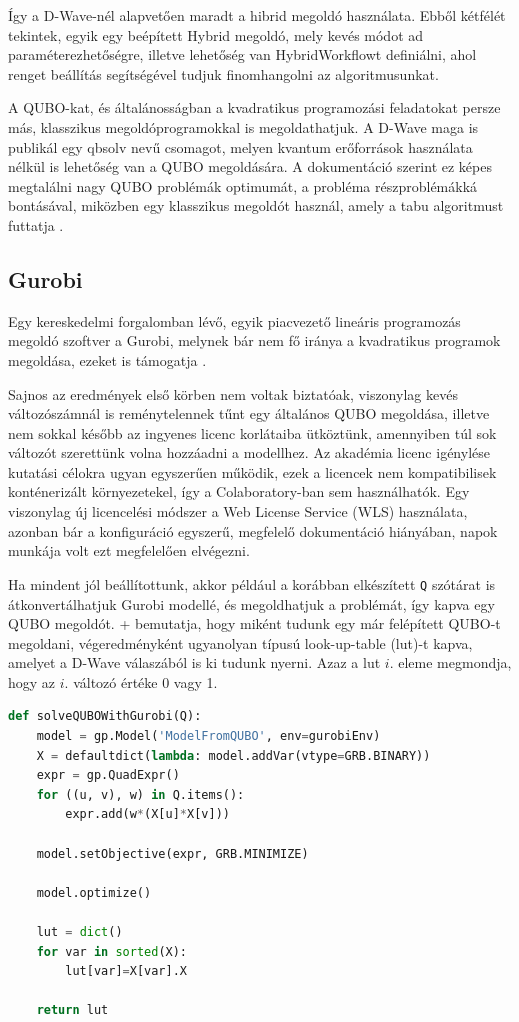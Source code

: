 Így a D-Wave-nél alapvetően maradt a hibrid megoldó használata. Ebből kétfélét tekintek, egyik egy beépített Hybrid megoldó, mely kevés módot ad paraméterezhetőségre, illetve lehetőség van HybridWorkflowt definiálni, ahol renget beállítás segítségével tudjuk finomhangolni az algoritmusunkat.

A QUBO-kat, és általánosságban a kvadratikus programozási feladatokat persze más, klasszikus megoldóprogramokkal is megoldathatjuk. A D-Wave maga is publikál egy qbsolv nevű csomagot, melyen kvantum erőforrások használata nélkül is lehetőség van a QUBO megoldására. A dokumentáció szerint ez képes megtalálni nagy QUBO problémák optimumát, a probléma részproblémákká bontásával, miközben egy klasszikus megoldót használ, amely a tabu algoritmust futtatja \cite{DWaveOceanQbsolv}. 

\subsection{Gurobi}\label{sec:Gurobi}

Egy kereskedelmi forgalomban lévő, egyik piacvezető lineáris programozás megoldó szoftver a Gurobi, melynek bár nem fő iránya a kvadratikus programok megoldása, ezeket is támogatja \cite{gurobi}. 

Sajnos az eredmények első körben nem voltak biztatóak, viszonylag kevés változószámnál is reménytelennek tűnt egy általános QUBO megoldása, illetve nem sokkal később az ingyenes licenc korlátaiba ütköztünk, amennyiben túl sok változót szerettünk volna hozzáadni a modellhez. Az akadémia licenc igénylése kutatási célokra ugyan egyszerűen működik, ezek a licencek nem kompatibilisek konténerizált környezetekel, így a Colaboratory-ban sem használhatók. Egy viszonylag új licencelési módszer a Web License Service (WLS) használata\cite{gurobiWLS}, azonban bár a konfiguráció egyszerű, megfelelő dokumentáció hiányában, napok munkája volt ezt megfelelően elvégezni\cite{gurobiAcademicColab}.

Ha mindent jól beállítottunk, akkor például a korábban elkészített \verb+Q+ szótárat is átkonvertálhatjuk Gurobi modellé, és megoldhatjuk a problémát, így kapva egy QUBO megoldót. \Az+ bemutatja, hogy miként tudunk egy már felépített QUBO-t megoldani, végeredményként ugyanolyan típusú look-up-table (lut)-t kapva, amelyet a D-Wave válaszából is ki tudunk nyerni. Azaz a lut $i.$ eleme megmondja, hogy az $i.$ változó értéke 0 vagy 1.

\begin{lstlisting}[language=python,caption=QUBO megoldása Gurobival,label=code:solveQUBOWithGurobi]	
def solveQUBOWithGurobi(Q):
	model = gp.Model('ModelFromQUBO', env=gurobiEnv)
	X = defaultdict(lambda: model.addVar(vtype=GRB.BINARY))
	expr = gp.QuadExpr()
	for ((u, v), w) in Q.items():
		expr.add(w*(X[u]*X[v]))
	
	model.setObjective(expr, GRB.MINIMIZE)
	
	model.optimize()
	
	lut = dict()
	for var in sorted(X):
		lut[var]=X[var].X
	
	return lut
	
\end{lstlisting}

